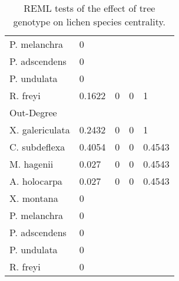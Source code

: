\begin{table}[ht]
\begin{tabular}{lllll}
  P. melanchra & 0 &  &  &  \\ 
  P. adscendens & 0 &  &  &  \\ 
  P. undulata & 0 &  &  &  \\ 
  R. freyi & 0.1622 & 0 & 0 & 1 \\ 
  Out-Degree &  &  &  &  \\ 
  X. galericulata & 0.2432 & 0 & 0 & 1 \\ 
  C. subdeflexa & 0.4054 & 0 & 0 & 0.4543 \\ 
  M. hagenii & 0.027 & 0 & 0 & 0.4543 \\ 
  A. holocarpa & 0.027 & 0 & 0 & 0.4543 \\ 
  X. montana & 0 &  &  &  \\ 
  P. melanchra & 0 &  &  &  \\ 
  P. adscendens & 0 &  &  &  \\ 
  P. undulata & 0 &  &  &  \\ 
  R. freyi & 0 &  &  &  \\ 
   \hline
\end{tabular}
\caption{REML tests of the effect of tree genotype on lichen species centrality.} 
\label{tab:sppcen}
\end{table}
